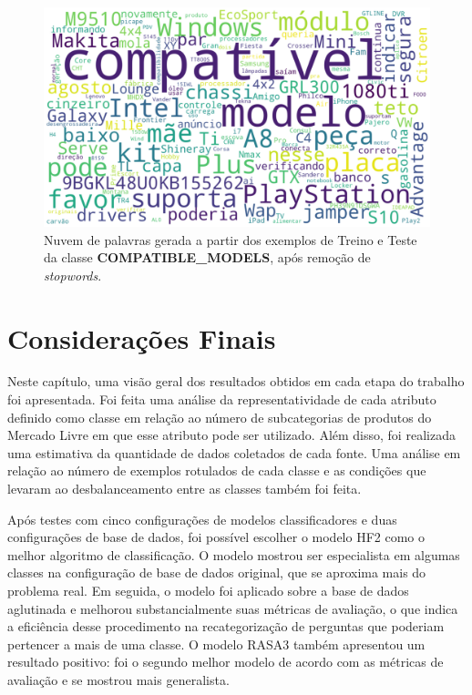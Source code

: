 \begin{figure}[!ht]
    \centering
	\includegraphics[width=1\linewidth]{figuras/compatible_models.png}
	\caption{Nuvem de palavras gerada a partir dos exemplos de Treino e Teste da classe \textbf{COMPATIBLE\_MODELS}, após remoção de \textit{stopwords}.}
	\label{fig:compatible_models}
\end{figure}

\clearpage %
\section{Considerações Finais}
Neste capítulo, uma visão geral dos resultados obtidos em cada etapa do trabalho foi apresentada. Foi feita uma análise da representatividade de cada atributo definido como classe em relação ao número de subcategorias de produtos do Mercado Livre em que esse atributo pode ser utilizado. Além disso, foi realizada uma estimativa da quantidade de dados coletados de cada fonte. Uma análise em relação ao número de exemplos rotulados de cada classe e as condições que levaram ao desbalanceamento entre as classes também foi feita.

Após testes com cinco configurações de modelos classificadores e duas configurações de base de dados, foi possível escolher o modelo HF2 como o melhor algoritmo de classificação. O modelo mostrou ser especialista em algumas classes na configuração de base de dados original, que se aproxima mais do problema real. Em seguida, o modelo foi aplicado sobre a base de dados aglutinada e melhorou substancialmente suas métricas de avaliação, o que indica a eficiência desse procedimento na recategorização de perguntas que poderiam pertencer a mais de uma classe. O modelo RASA3 também apresentou um resultado positivo: foi o segundo melhor modelo de acordo com as métricas de avaliação e se mostrou mais generalista.

